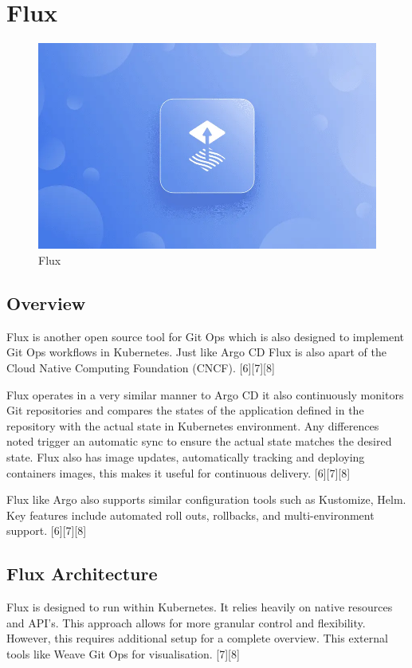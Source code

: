 \documentclass[conference]{IEEEtran}
\begin{document}
\section{Flux}

\begin{figure}[htbp]
    \centering
    \includegraphics[width=0.5\linewidth]{FluxImage.png}
    \caption{Flux}
    \label{fig:flux}
\end{figure}

\subsection{Overview}
Flux is another open source tool for Git Ops which is also designed to implement Git Ops workflows in Kubernetes. Just like Argo CD Flux is also apart of the Cloud Native Computing Foundation (CNCF). [6][7][8]

Flux operates in a very similar manner to Argo CD it also continuously monitors Git repositories and compares the states of the application defined in the repository with the actual state in Kubernetes environment. Any differences noted trigger an automatic sync to ensure the actual state matches the desired state. Flux also has image updates, automatically tracking and deploying containers images, this makes it useful for continuous delivery. [6][7][8] 

Flux like Argo also supports similar configuration tools such as Kustomize, Helm. Key features include automated roll outs, rollbacks, and multi-environment support. [6][7][8]

\subsection{Flux Architecture}
Flux is designed to run within Kubernetes. It relies heavily on native resources and API's. This approach allows for more granular control and flexibility. However, this requires additional setup for a complete overview. This external tools like Weave Git Ops for visualisation. [7][8]
\end{document}

